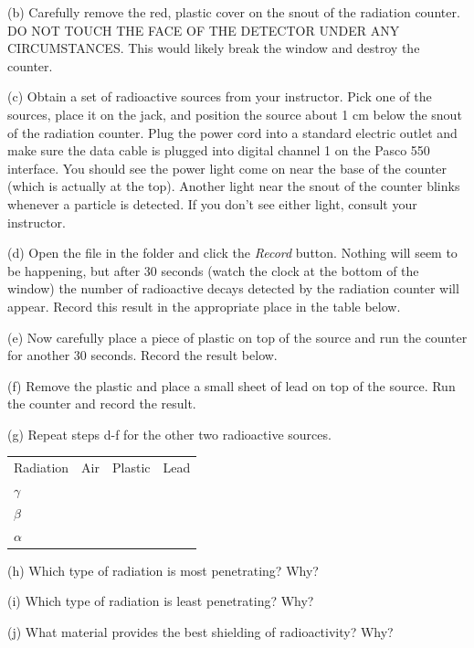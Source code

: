 (b) Carefully remove the red, plastic cover on the snout of the radiation counter.
DO NOT TOUCH THE FACE OF THE DETECTOR UNDER ANY CIRCUMSTANCES. This would likely
break the window and destroy the counter.

(c) Obtain a set of radioactive sources from your instructor.
Pick one of the sources, place it on the jack, and position the source about 1 cm below
the snout of the radiation counter.
Plug the power cord into a standard electric outlet and make sure the data cable is plugged
into digital channel 1 on the Pasco 550 interface.
You should see the power light come on near the base of the counter (which is actually at the
top).
Another light near the snout of the counter blinks whenever a particle
is detected.
If you don't see either light, consult your instructor.

(d) Open the  file in the \filename{\coursefolder} folder and click
the \textit{Record} button.
Nothing will seem to be happening, but after 30 seconds (watch the clock at the bottom
of the window) the number of radioactive decays detected by the 
radiation counter will appear.
Record this result in the appropriate place in the table below.

(e) Now carefully place a piece of plastic on top of the source and run the
counter for another 30 seconds. Record the result below.

(f) Remove the plastic and place a small sheet of lead on top of the source.
Run the counter and record the result.

(g) Repeat steps d-f for the other two radioactive sources.


\vspace{0.3cm}
{\renewcommand{\arraystretch}{1.1}
{\centering \begin{tabular}{*{4}{|C{0.7in}}|}%
\hline 
Radiation & Air & Plastic & Lead \\
\hhline{|=|=|=|=|}
\( \gamma \)&
&
&
\\
\hline 
\( \beta \)&
&
&
\\
\hline 
\( \alpha \)&
&
&
\\
\hline
\end{tabular}\par}}
\answerspace{0.3cm}

(h) Which type of radiation is most penetrating? Why?
\answerspace{15mm}

(i) Which type of radiation is least penetrating? Why?
\answerspace{15mm}

(j) What material provides the best shielding of radioactivity? Why?
\answerspace{15mm}

